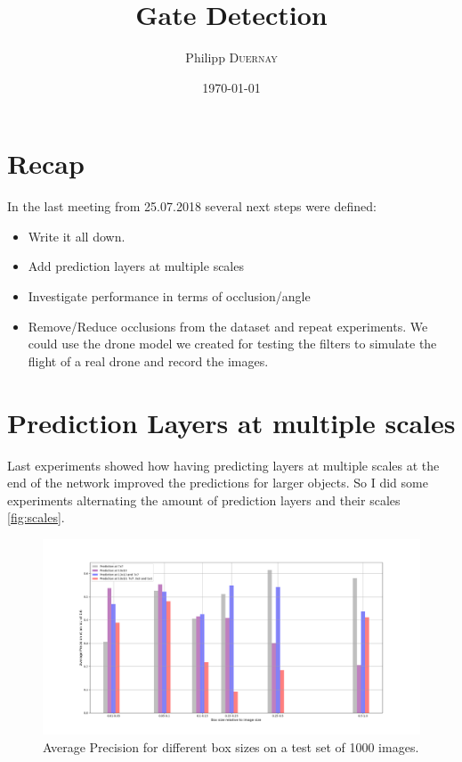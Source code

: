 \documentclass{article}
\title{Gate Detection} %
\author{Philipp \textsc{Duernay}} %
\date{\today} %
\begin{document}
\maketitle


\section{Recap}
In the last meeting from 25.07.2018 several next steps were defined:
\begin{itemize}
	\item Write it all down.
	\item Add prediction layers at multiple scales
	\item Investigate performance in terms of occlusion/angle
	\item Remove/Reduce occlusions from the dataset and repeat experiments. We could use the drone model we created for testing the filters to simulate the flight of a real drone and record the images.
	
\end{itemize}

\section{Prediction Layers at multiple scales}

Last experiments showed how having predicting layers at multiple scales at the end of the network improved the predictions for larger objects. So I did some experiments alternating the amount of prediction layers and their scales \autoref{fig:scales}.

\begin{figure}[htbp]
	\includegraphics[width=\linewidth]{area}
	\caption{Average Precision for different box sizes on a test set of 1000 images.}
	\label{fig:scales}
\end{figure}
\end{document}
